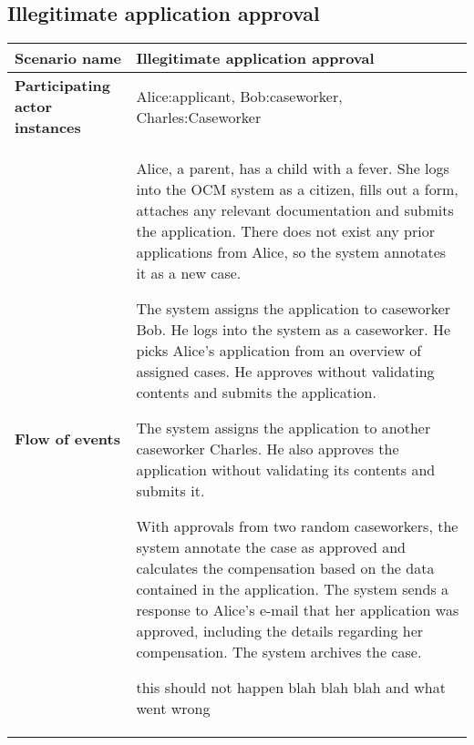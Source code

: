 \subsection*{Illegitimate application approval}
\begin{table}[htb!]
\begin{tabularx}{\textwidth}{l|X}
	\textbf{Scenario name} &  Illegitimate application approval\\
	\hline
	\textbf{Participating actor instances} & Alice:applicant, Bob:caseworker, Charles:Caseworker\\
	\hline
	\textbf{Flow of events} &
	\begin{compactenum}
	        \item Alice, a parent, has a child with a fever. She logs into the OCM system as a citizen, fills out a form, attaches any relevant documentation and submits the application. There does not exist any prior applications from Alice, so the system annotates it as a new case.
	        \item The system assigns the application to caseworker Bob. He logs into the system as a caseworker. He picks Alice's application from an overview of assigned cases. He approves without validating contents and submits the application.
            \item The system assigns the application to another caseworker Charles. He also approves the application without validating its contents and submits it.
            \item With approvals from two random caseworkers, the system annotate the case as approved and calculates the compensation based on the data contained in the application. The system sends a response to Alice's e-mail that her application was approved, including the details regarding her compensation. The system archives the case.
            \item this should not happen blah blah blah and what went wrong
	\end{compactenum}\\
	\hline
\end{tabularx}
\end{table}

\newpage
